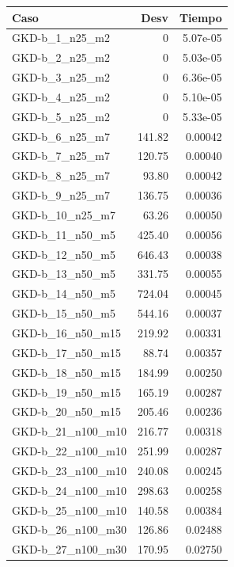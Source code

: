 \documentclass{article}
\begin{document}
\begin{table}[ht]
\centering
\footnotesize
\begin{tabular}{|l|r|r|}
\hline
\textbf{Caso} & \textbf{Desv} & \textbf{Tiempo} \\ \hline
GKD-b\_1\_n25\_m2 & 0 & 5.07e-05 \\ \hline
GKD-b\_2\_n25\_m2 & 0 & 5.03e-05 \\ \hline
GKD-b\_3\_n25\_m2 & 0 & 6.36e-05 \\ \hline
GKD-b\_4\_n25\_m2 & 0 & 5.10e-05 \\ \hline
GKD-b\_5\_n25\_m2 & 0 & 5.33e-05 \\ \hline
GKD-b\_6\_n25\_m7 & 141.82 & 0.00042 \\ \hline
GKD-b\_7\_n25\_m7 & 120.75 & 0.00040 \\ \hline
GKD-b\_8\_n25\_m7 & 93.80 & 0.00042 \\ \hline
GKD-b\_9\_n25\_m7 & 136.75 & 0.00036 \\ \hline
GKD-b\_10\_n25\_m7 & 63.26 & 0.00050 \\ \hline
GKD-b\_11\_n50\_m5 & 425.40 & 0.00056 \\ \hline
GKD-b\_12\_n50\_m5 & 646.43 & 0.00038 \\ \hline
GKD-b\_13\_n50\_m5 & 331.75 & 0.00055 \\ \hline
GKD-b\_14\_n50\_m5 & 724.04 & 0.00045 \\ \hline
GKD-b\_15\_n50\_m5 & 544.16 & 0.00037 \\ \hline
GKD-b\_16\_n50\_m15 & 219.92 & 0.00331 \\ \hline
GKD-b\_17\_n50\_m15 & 88.74 & 0.00357 \\ \hline
GKD-b\_18\_n50\_m15 & 184.99 & 0.00250 \\ \hline
GKD-b\_19\_n50\_m15 & 165.19 & 0.00287 \\ \hline
GKD-b\_20\_n50\_m15 & 205.46 & 0.00236 \\ \hline
GKD-b\_21\_n100\_m10 & 216.77 & 0.00318 \\ \hline
GKD-b\_22\_n100\_m10 & 251.99 & 0.00287 \\ \hline
GKD-b\_23\_n100\_m10 & 240.08 & 0.00245 \\ \hline
GKD-b\_24\_n100\_m10 & 298.63 & 0.00258 \\ \hline
GKD-b\_25\_n100\_m10 & 140.58 & 0.00384 \\ \hline
GKD-b\_26\_n100\_m30 & 126.86 & 0.02488 \\ \hline
GKD-b\_27\_n100\_m30 & 170.95 & 0.02750 \\ \hline

\end{tabular}
\end{table}
\end{document}
